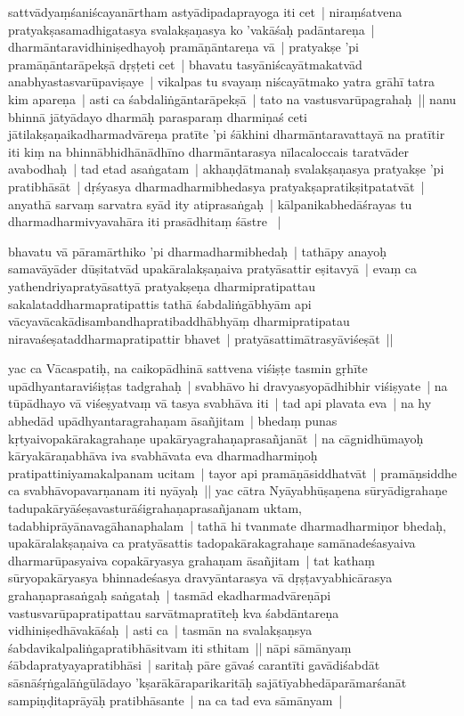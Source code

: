 \documentclass[article,12pt,a4paper]{memoir}%
\newcounter{parCount}
\begin{document}
sattvādyaṃśaniścayanārtham astyādipadaprayoga iti cet | \label{thakur75-62.8} niraṃśatvena pratyakṣasamadhigatasya svalakṣaṇasya ko 'vakāśaḥ padāntareṇa | dharmāntaravidhiniṣedhayoḥ pramāṇāntareṇa vā | pratyakṣe 'pi pramāṇāntarāpekṣā dṛṣṭeti cet | bhavatu tasyāniścayātmakatvād anabhyastasvarūpaviṣaye | vikalpas tu svayaṃ niścayātmako yatra grāhī tatra kim apareṇa | asti ca śabdaliṅgāntarāpekṣā | tato na vastusvarūpagrahaḥ || \label{thakur75-62.13} nanu bhinnā jātyādayo dharmāḥ parasparaṃ dharmiṇaś ceti jātilakṣaṇaikadharmadvāreṇa pratīte 'pi śākhini dharmāntaravattayā na pratītir iti kiṃ na bhinnābhidhānādhīno dharmāntarasya nīlacaloccais taratvāder avabodhaḥ | tad etad asaṅgatam | akhaṇḍātmanaḥ svalakṣaṇasya pratyakṣe 'pi pratibhāsāt | dṛśyasya dharmadharmibhedasya pratyakṣapratikṣitpatatvāt | anyathā sarvaṃ sarvatra syād ity atiprasaṅgaḥ | kālpanikabhedāśrayas tu dharmadharmivyavahāra iti prasādhitaṃ śāstre  |
	{}
	\pend%
      

	  \pstart \leavevmode%
	\label{thakur75-62.19}bhavatu vā pāramārthiko 'pi dharmadharmibhedaḥ | tathāpy anayoḥ samavāyāder dūṣitatvād upakāralakṣaṇaiva pratyāsattir eṣitavyā | evaṃ ca yathendriyapratyāsattyā pratyakṣeṇa dharmipratipattau sakalataddharmapratipattis tathā śabdaliṅgābhyām api vācyavācakādisambandhapratibaddhābhyāṃ dharmipratipatau niravaśeṣataddharmapratipattir bhavet | pratyāsattimātrasyāviśeṣāt ||
	{}
	\pend%
      

	  \pstart \leavevmode%
	\label{thakur75-62.24}yac ca Vācaspatiḥ, na caikopādhinā sattvena viśiṣṭe tasmin gṛhīte upādhyantaraviśiṣṭas tadgrahaḥ | svabhāvo hi dravyasyopādhibhir viśiṣyate | na tūpādhayo vā viśeṣyatvaṃ vā tasya svabhāva iti | tad api plavata eva | na hy abhedād upādhyantaragrahaṇam āsañjitam | bhedaṃ punas kṛtyaivopakārakagrahaṇe upakāryagrahaṇaprasañjanāt | na cāgnidhūmayoḥ kāryakāraṇabhāva iva svabhāvata eva dharmadharmiṇoḥ pratipattiniyamakalpanam ucitam | tayor api pramāṇāsiddhatvāt | pramāṇsiddhe ca svabhāvopavarṇanam iti nyāyaḥ || \label{thakur75-63.3} yac cātra Nyāyabhūṣaṇena sūryādigrahaṇe tadupakāryāśeṣavasturāśigrahaṇaprasañjanam uktam, tadabhiprāyānavagāhanaphalam | tathā hi tvanmate dharmadharmiṇor bhedaḥ, upakāralakṣaṇaiva ca pratyāsattis tadopakārakagrahaṇe samānadeśasyaiva dharmarūpasyaiva copakāryasya grahaṇam āsañjitam | tat kathaṃ sūryopakāryasya bhinnadeśasya dravyāntarasya vā dṛṣṭavyabhicārasya grahaṇaprasaṅgaḥ saṅgataḥ | tasmād ekadharmadvāreṇāpi vastusvarūpapratipattau sarvātmapratīteḥ kva śabdāntareṇa vidhiniṣedhāvakāśaḥ | asti ca | tasmān na svalakṣaṇsya śabdavikalpaliṅgapratibhāsitvam iti sthitam || \label{thakur75-63.10} nāpi sāmānyaṃ śābdapratyayapratibhāsi | saritaḥ pāre gāvaś carantīti gavādiśabdāt sāsnāśṛṅgalāṅgūlādayo 'kṣarākāraparikaritāḥ sajātīyabhedāparāmarśanāt sampiṇḍitaprāyāḥ pratibhāsante | na ca tad eva sāmānyam |
	{}
	\pend%
      
\end{document}
